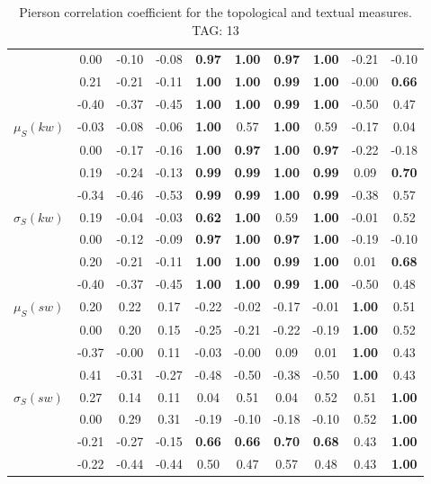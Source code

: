 \begin{table*}[h!]
\begin{center}
\begin{tabular}{| l || c | c | c | c | c | c | c | c | c |}
 & 0.00 & -0.10 & -0.08 & {\bf 0.97} & {\bf 1.00} & {\bf 0.97} & {\bf 1.00} & -0.21 & -0.10 \\
 & 0.21 & -0.21 & -0.11 & {\bf 1.00} & {\bf 1.00} & {\bf 0.99} & {\bf 1.00} & -0.00 & {\bf 0.66} \\
 & -0.40 & -0.37 & -0.45 & {\bf 1.00} & {\bf 1.00} & {\bf 0.99} & {\bf 1.00} & -0.50 & 0.47 \\\hline
$\mu_S(kw)$ & -0.03 & -0.08 & -0.06 & {\bf 1.00} & 0.57 & {\bf 1.00} & 0.59 & -0.17 & 0.04 \\
 & 0.00 & -0.17 & -0.16 & {\bf 1.00} & {\bf 0.97} & {\bf 1.00} & {\bf 0.97} & -0.22 & -0.18 \\
 & 0.19 & -0.24 & -0.13 & {\bf 0.99} & {\bf 0.99} & {\bf 1.00} & {\bf 0.99} & 0.09 & {\bf 0.70} \\
 & -0.34 & -0.46 & -0.53 & {\bf 0.99} & {\bf 0.99} & {\bf 1.00} & {\bf 0.99} & -0.38 & 0.57 \\\hline
$\sigma_S(kw)$ & 0.19 & -0.04 & -0.03 & {\bf 0.62} & {\bf 1.00} & 0.59 & {\bf 1.00} & -0.01 & 0.52 \\
 & 0.00 & -0.12 & -0.09 & {\bf 0.97} & {\bf 1.00} & {\bf 0.97} & {\bf 1.00} & -0.19 & -0.10 \\
 & 0.20 & -0.21 & -0.11 & {\bf 1.00} & {\bf 1.00} & {\bf 0.99} & {\bf 1.00} & 0.01 & {\bf 0.68} \\
 & -0.40 & -0.37 & -0.45 & {\bf 1.00} & {\bf 1.00} & {\bf 0.99} & {\bf 1.00} & -0.50 & 0.48 \\\hline
$\mu_S(sw)$ & 0.20 & 0.22 & 0.17 & -0.22 & -0.02 & -0.17 & -0.01 & {\bf 1.00} & 0.51 \\
 & 0.00 & 0.20 & 0.15 & -0.25 & -0.21 & -0.22 & -0.19 & {\bf 1.00} & 0.52 \\
 & -0.37 & -0.00 & 0.11 & -0.03 & -0.00 & 0.09 & 0.01 & {\bf 1.00} & 0.43 \\
 & 0.41 & -0.31 & -0.27 & -0.48 & -0.50 & -0.38 & -0.50 & {\bf 1.00} & 0.43 \\\hline
$\sigma_S(sw)$ & 0.27 & 0.14 & 0.11 & 0.04 & 0.51 & 0.04 & 0.52 & 0.51 & {\bf 1.00} \\
 & 0.00 & 0.29 & 0.31 & -0.19 & -0.10 & -0.18 & -0.10 & 0.52 & {\bf 1.00} \\
 & -0.21 & -0.27 & -0.15 & {\bf 0.66} & {\bf 0.66} & {\bf 0.70} & {\bf 0.68} & 0.43 & {\bf 1.00} \\
 & -0.22 & -0.44 & -0.44 & 0.50 & 0.47 & 0.57 & 0.48 & 0.43 & {\bf 1.00} \\\hline
\end{tabular}
\caption{Pierson correlation coefficient for the topological and textual measures. TAG: 13}
\end{center}
\end{table*}